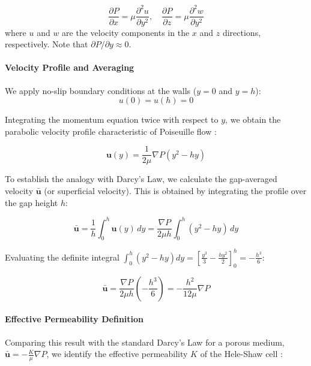 \begin{equation}
    \frac{\partial P}{\partial x} = \mu \frac{\partial^2 u}{\partial y^2}, \quad \frac{\partial P}{\partial z} = \mu \frac{\partial^2 w}{\partial y^2}
\end{equation}
where $u$ and $w$ are the velocity components in the $x$ and $z$ directions, respectively.
Note that $\partial P / \partial y \approx 0$.

\paragraph{Velocity Profile and Averaging}
We apply no-slip boundary conditions at the walls ($y=0$ and $y=h$):
\begin{equation}
    u(0) = u(h) = 0
\end{equation}

Integrating the momentum equation twice with respect to $y$, we obtain the parabolic velocity profile characteristic of Poiseuille flow \cite{batchelor1967introduction}:

\begin{equation}
    \mathbf{u}(y) = \frac{1}{2\mu} \nabla P (y^2 - hy)
\end{equation}

To establish the analogy with Darcy's Law, we calculate the gap-averaged velocity $\bar{\mathbf{u}}$ (or superficial velocity).
This is obtained by integrating the profile over the gap height $h$:

\begin{equation}
    \bar{\mathbf{u}} = \frac{1}{h} \int_0^h \mathbf{u}(y) \, dy = \frac{\nabla P}{2\mu h} \int_0^h (y^2 - hy) \, dy
\end{equation}

Evaluating the definite integral $\int_0^h (y^2 - hy) dy = \left[\frac{y^3}{3} - \frac{hy^2}{2}\right]_0^h = -\frac{h^3}{6}$:

\begin{equation}
    \bar{\mathbf{u}} = \frac{\nabla P}{2\mu h} \left( -\frac{h^3}{6} \right) = -\frac{h^2}{12\mu} \nabla P
\end{equation}

\paragraph{Effective Permeability Definition}
Comparing this result with the standard Darcy's Law for a porous medium, $\bar{\mathbf{u}} = -\frac{K}{\mu} \nabla P$, we identify the effective permeability $K$ of the Hele-Shaw cell \cite{bear1972dynamics}:

